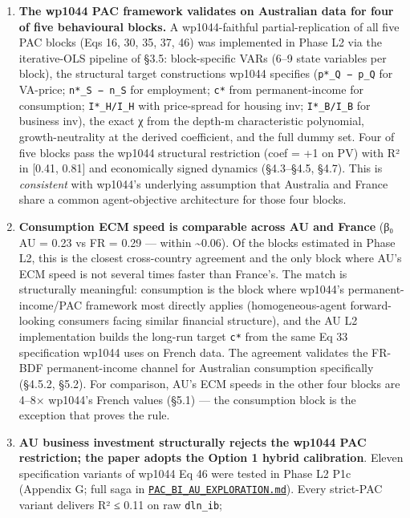 \documentclass[
]{article}
\begin{document}
\begin{enumerate}
\def\labelenumi{\arabic{enumi}.}
\item
  \textbf{The wp1044 PAC framework validates on Australian data for four
  of five behavioural blocks.} A wp1044-faithful partial-replication of
  all five PAC blocks (Eqs 16, 30, 35, 37, 46) was implemented in Phase
  L2 via the iterative-OLS pipeline of §3.5: block-specific VARs (6--9
  state variables per block), the structural target constructions wp1044
  specifies (\texttt{p*\_Q\ −\ p\_Q} for VA-price;
  \texttt{n*\_S\ −\ n\_S} for employment; \texttt{c*} from
  permanent-income for consumption; \texttt{I*\_H/I\_H} with
  price-spread for housing inv; \texttt{I*\_B/I\_B} for business inv),
  the exact χ from the depth-m characteristic polynomial,
  growth-neutrality at the derived coefficient, and the full dummy set.
  Four of five blocks pass the wp1044 structural restriction (coef = +1
  on PV) with R² in {[}0.41, 0.81{]} and economically signed dynamics
  (§4.3--§4.5, §4.7). This is \emph{consistent} with wp1044's underlying
  assumption that Australia and France share a common agent-objective
  architecture for those four blocks.
\item
  \textbf{Consumption ECM speed is comparable across AU and France} (β₀
  AU = 0.23 vs FR = 0.29 --- within \textasciitilde0.06). Of the blocks
  estimated in Phase L2, this is the closest cross-country agreement and
  the only block where AU's ECM speed is not several times faster than
  France's. The match is structurally meaningful: consumption is the
  block where wp1044's permanent-income/PAC framework most directly
  applies (homogeneous-agent forward-looking consumers facing similar
  financial structure), and the AU L2 implementation builds the long-run
  target \texttt{c*} from the same Eq 33 specification wp1044 uses on
  French data. The agreement validates the FR-BDF permanent-income
  channel for Australian consumption specifically (§4.5.2, §5.2). For
  comparison, AU's ECM speeds in the other four blocks are 4--8×
  wp1044's French values (§5.1) --- the consumption block is the
  exception that proves the rule.
\item
  \textbf{AU business investment structurally rejects the wp1044 PAC
  restriction; the paper adopts the Option 1 hybrid calibration}. Eleven
  specification variants of wp1044 Eq 46 were tested in Phase L2 P1c
  (Appendix G; full saga in
  \href{../PAC_BI_AU_EXPLORATION.md}{\texttt{PAC\_BI\_AU\_EXPLORATION.md}}).
  Every strict-PAC variant delivers R² ≤ 0.11 on raw \texttt{dln\_ib};

\end{enumerate}
\end{document}
